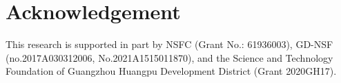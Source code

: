 \documentclass[sigconf]{acmart}
\begin{document}
\section*{Acknowledgement}
This research is supported in part by NSFC (Grant No.: 61936003), GD-NSF (no.2017A030312006, No.2021A1515011870), and the Science and Technology Foundation of Guangzhou Huangpu Development District (Grant 2020GH17).
\end{document}
